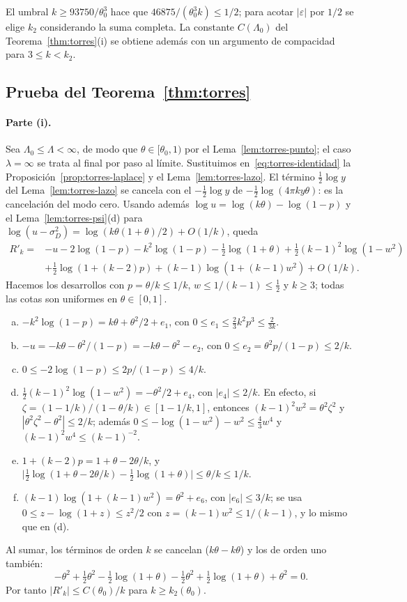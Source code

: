 El umbral $k\ge93750/\theta_0^3$ hace que $46875/(\theta_0^3k)\le1/2$; para acotar $|\varepsilon|$ por $1/2$
se elige $k_2$ considerando la suma completa. La constante $C(\Lambda_0)$ del Teorema~\ref{thm:torres}(i)
se obtiene además con un argumento de compacidad para $3\le k<k_2$.

\subsection{Prueba del Teorema~\ref{thm:torres}}\label{sec:torres-i}

\paragraph{Parte (i).}
Sea $\Lambda_0\le\Lambda<\infty$, de modo que $\theta\in[\theta_0,1)$ por el Lema~\ref{lem:torres-punto}; el
caso $\lambda=\infty$ se trata al final por paso al límite. Sustituimos en~\eqref{eq:torres-identidad} la
Proposición~\ref{prop:torres-laplace} y el Lema~\ref{lem:torres-lazo}. El término $\frac12\log y$ del
Lema~\ref{lem:torres-lazo} se cancela con el $-\frac12\log y$ de $-\frac12\log(4\pi ky\theta)$: es la
cancelación del modo cero. Usando además $\log u=\log(k\theta)-\log(1-p)$ y el
Lema~\ref{lem:torres-psi}(d) para $\log(u-\sigma_D^2)=\log(k\theta(1+\theta)/2)+O(1/k)$, queda
\[
\begin{aligned}
 R'_k={}&-u-2\log(1-p)-k^2\log(1-p)-\tfrac12\log(1+\theta)+\tfrac12(k-1)^2\log(1-w^2)\\
 &+\tfrac12\log(1+(k-2)p)+(k-1)\log(1+(k-1)w^2)+O(1/k).
\end{aligned}
\]
Hacemos los desarrollos con $p=\theta/k\le1/k$, $w\le1/(k-1)\le\frac12$ y $k\ge3$; todas las cotas son
uniformes en $\theta\in[0,1]$.
\begin{enumerate}[(a)]
\item $-k^2\log(1-p)=k\theta+\theta^2/2+e_1$, con $0\le e_1\le\frac23k^2p^3\le\frac2{3k}$.
\item $-u=-k\theta-\theta^2/(1-p)=-k\theta-\theta^2-e_2$, con $0\le e_2=\theta^2p/(1-p)\le2/k$.
\item $0\le-2\log(1-p)\le2p/(1-p)\le4/k$.
\item $\frac12(k-1)^2\log(1-w^2)=-\theta^2/2+e_4$, con $|e_4|\le2/k$. En efecto, si
 $\zeta=(1-1/k)/(1-\theta/k)\in[1-1/k,1]$, entonces $(k-1)^2w^2=\theta^2\zeta^2$ y
 $|\theta^2\zeta^2-\theta^2|\le2/k$; además $0\le-\log(1-w^2)-w^2\le\frac43w^4$ y $(k-1)^2w^4\le(k-1)^{-2}$.
\item $1+(k-2)p=1+\theta-2\theta/k$, y
 $\bigl|\frac12\log(1+\theta-2\theta/k)-\frac12\log(1+\theta)\bigr|\le\theta/k\le1/k$.
\item $(k-1)\log(1+(k-1)w^2)=\theta^2+e_6$, con $|e_6|\le3/k$; se usa $0\le z-\log(1+z)\le z^2/2$ con
 $z=(k-1)w^2\le1/(k-1)$, y lo mismo que en (d).
\end{enumerate}
Al sumar, los términos de orden $k$ se cancelan ($k\theta-k\theta$) y los de orden uno también:
\[
 -\theta^2+\tfrac12\theta^2-\tfrac12\log(1+\theta)-\tfrac12\theta^2+\tfrac12\log(1+\theta)+\theta^2=0.
\]
Por tanto $|R'_k|\le C(\theta_0)/k$ para $k\ge k_2(\theta_0)$.

